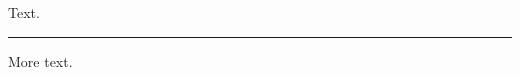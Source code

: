 \documentclass[twocolumn]{article}
\begin{document}
Text.
\begin{wideband}\centering\rule{2pt}{1.2\textheight}\end{wideband}
More text.
\end{document}
